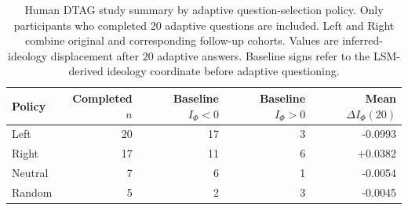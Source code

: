 \begin{table}[!t]
\centering
\caption{Human DTAG study summary by adaptive question-selection policy.
Only participants who completed 20 adaptive questions are included.
Left and Right combine original and corresponding follow-up cohorts.
Values are inferred-ideology displacement after 20 adaptive answers.
Baseline signs refer to the LSM-derived ideology coordinate before
adaptive questioning.}
\label{tab:humanstudy-participants}
\small
\setlength{\tabcolsep}{11pt}
\begin{tabular}{lrrrr}
\toprule
Policy & Completed $n$ & Baseline $I_\Phi<0$ & Baseline $I_\Phi>0$ & Mean $\Delta I_\Phi(20)$ \\
\midrule
Left & 20 & 17 & 3 & -0.0993 \\
Right & 17 & 11 & 6 & +0.0382 \\
Neutral & 7 & 6 & 1 & -0.0054 \\
Random & 5 & 2 & 3 & -0.0045 \\
\bottomrule
\end{tabular}
\end{table}

